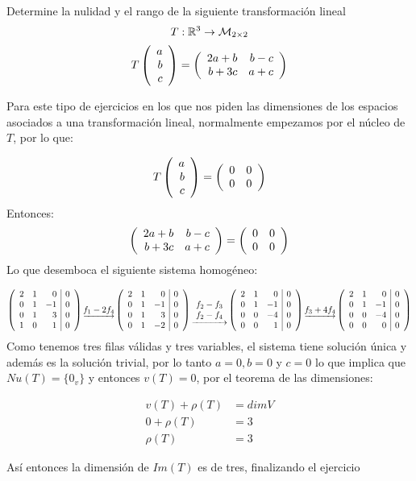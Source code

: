 \begin{ejemplo}
Determine la nulidad y el rango de la siguiente transformación lineal 
$$T: \rtres \to \mdosxdos$$
$$T\vectrtres{a}{b}{c} = \matrdxd{2a+b & b-c}{b+3c & a+c}$$
\end{ejemplo}
\begin{sol}
    Para este tipo de ejercicios en los que nos piden las dimensiones de los espacios asociados a una transformación lineal, normalmente empezamos por el núcleo de $T$, por lo que:
    
    $$T\vectrtres{a}{b}{c} = \matrdxd{0&0}{0&0}$$
    Entonces:
    $$\matrdxd{2a+b & b-c}{b+3c & a+c} = \matrdxd{0&0}{0&0}$$
    Lo que desemboca el siguiente sistema homogéneo:
    
    $$\reducir{rrr|r}{
        2&1&0&0\\
        0&1&-1&0\\
        0&1&3&0\\
        1&0&1&0
    } \underrightarrow{f_1 - 2f_4}
    \reducir{rrr|r}{
        2&1&0&0\\
        0&1&-1&0\\
        0&1&3&0\\   
        0&1&-2&0
    } \underrightarrow{\begin{array}{c}
        f_2 - f_3\\
        f_2 - f_4
    \end{array}}
    \reducir{rrr|r}{
        2&1&0&0\\
        0&1&-1&0\\
        0&0&-4&0\\
        0&0&1&0
    } \underrightarrow{f_3 + 4f_4}
    \reducir{rrr|r}{
        2&1&0&0\\
        0&1&-1&0\\
        0&0&-4&0\\
        0&0&0&0
    }        
    $$
    Como tenemos tres filas válidas y tres variables, el sistema tiene solución única y además es la solución trivial, por lo tanto $a = 0 , b = 0$ y $c = 0$ 
    lo que implica que $Nu(T) = \{0_v\}$ y entonces $v(T) = 0$, por el teorema de las dimensiones:
    
    \begin{align*}
        v(T) + \rho(T) &= dimV\\
        0 + \rho(T) &= 3\\
        \rho(T) &= 3
    \end{align*}
    
    Así entonces la dimensión de $Im(T)$ es de tres, finalizando el ejercicio
    
\end{sol}

